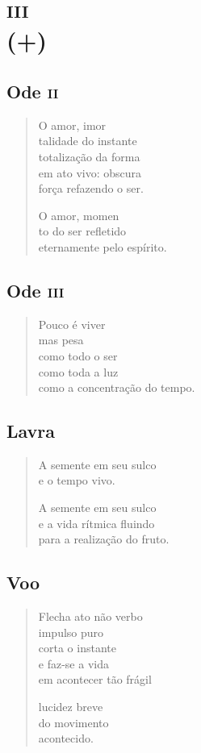 \part*{\textsc{iii}\\(+)}

\chapter{Ode \textsc{ii}}

\begin{verse}
O amor, imor\\
talidade do instante\\
totalização da forma\\
em ato vivo: obscura\\
força refazendo o ser.

O amor, momen\\
to do ser refletido\\
eternamente pelo espírito.
\end{verse}

\chapter{Ode \textsc{iii}}

\begin{verse}
Pouco é viver\\
mas pesa\\
como todo o ser\\
como toda a luz\\
como a concentração do tempo.
\end{verse}

\chapter{Lavra}

\begin{verse}
A semente em seu sulco\\
e o tempo vivo.

A semente em seu sulco\\
e a vida rítmica fluindo\\
para a realização do fruto.
\end{verse}

\chapter{Voo}

\begin{verse}
Flecha ato não verbo\\
impulso puro\\
corta o instante\\
e faz-se a vida\\
em acontecer tão frágil

lucidez breve\\
do movimento\\
acontecido.
\end{verse}

